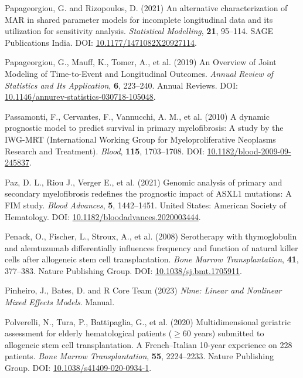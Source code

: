 \documentclass[
  letterpaper,
  DIV=11,
  numbers=noendperiod]{scrreprt}
\newlength{\cslhangindent}
\newenvironment{CSLReferences}[2] %
 {\begin{list}{}{%
  \setlength{\itemindent}{0pt}
  \setlength{\leftmargin}{0pt}
  \setlength{\parsep}{0pt}
  \ifodd #1
   \setlength{\leftmargin}{\cslhangindent}
   \setlength{\itemindent}{-1\cslhangindent}
  \fi
  \setlength{\itemsep}{#2\baselineskip}}}
 {\end{list}}
\begin{document}
\begin{CSLReferences}{1}{1}
Papageorgiou, G. and Rizopoulos, D. (2021) An alternative
characterization of {MAR} in shared parameter models for incomplete
longitudinal data and its utilization for sensitivity analysis.
\emph{Statistical Modelling}, \textbf{21}, 95--114. SAGE Publications
India. DOI:
\href{https://doi.org/10.1177/1471082X20927114}{10.1177/1471082X20927114}.

Papageorgiou, G., Mauff, K., Tomer, A., et al. (2019) An {Overview} of
{Joint Modeling} of {Time-to-Event} and {Longitudinal Outcomes}.
\emph{Annual Review of Statistics and Its Application}, \textbf{6},
223--240. Annual Reviews. DOI:
\href{https://doi.org/10.1146/annurev-statistics-030718-105048}{10.1146/annurev-statistics-030718-105048}.

Passamonti, F., Cervantes, F., Vannucchi, A. M., et al. (2010) A dynamic
prognostic model to predict survival in primary myelofibrosis: A study
by the {IWG-MRT} ({International Working Group} for {Myeloproliferative
Neoplasms Research} and {Treatment}). \emph{Blood}, \textbf{115},
1703--1708. DOI:
\href{https://doi.org/10.1182/blood-2009-09-245837}{10.1182/blood-2009-09-245837}.

Paz, D. L., Riou J., Verger E., et al. (2021) Genomic analysis of
primary and secondary myelofibrosis redefines the prognostic impact of
{ASXL1} mutations: {A FIM} study. \emph{Blood Advances}, \textbf{5},
1442--1451. United States: American Society of Hematology. DOI:
\href{https://doi.org/10.1182/bloodadvances.2020003444}{10.1182/bloodadvances.2020003444}.

Penack, O., Fischer, L., Stroux, A., et al. (2008) Serotherapy with
thymoglobulin and alemtuzumab differentially influences frequency and
function of natural killer cells after allogeneic stem cell
transplantation. \emph{Bone Marrow Transplantation}, \textbf{41},
377--383. Nature Publishing Group. DOI:
\href{https://doi.org/10.1038/sj.bmt.1705911}{10.1038/sj.bmt.1705911}.

Pinheiro, J., Bates, D. and R Core Team (2023) \emph{Nlme: {Linear} and
Nonlinear Mixed Effects Models}. Manual.

Polverelli, N., Tura, P., Battipaglia, G., et al. (2020)
Multidimensional geriatric assessment for elderly hematological patients
({\(\geq\)}60 years) submitted to allogeneic stem cell transplantation.
{A French}--{Italian} 10-year experience on 228 patients. \emph{Bone
Marrow Transplantation}, \textbf{55}, 2224--2233. Nature Publishing
Group. DOI:
\href{https://doi.org/10.1038/s41409-020-0934-1}{10.1038/s41409-020-0934-1}.


\end{CSLReferences}
\end{document}
